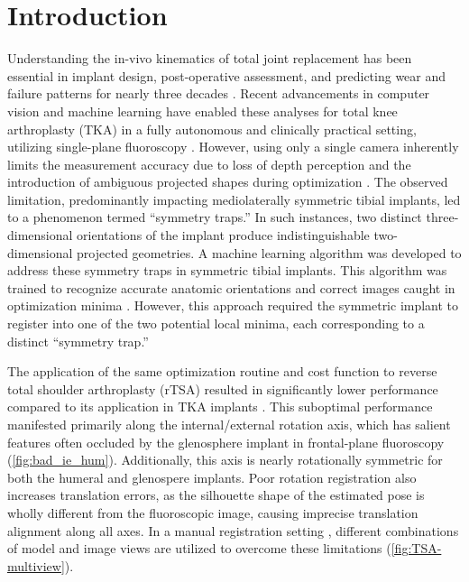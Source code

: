 \section{Introduction}
Understanding the in-vivo kinematics of total joint replacement has been essential in implant design, post-operative assessment, and predicting wear and failure patterns for nearly three decades \cite{freglyComputationalWearPrediction2005,banks2003HapPaul2004,banksRationaleResultsFixedBearing2019}.
Recent advancements in computer vision and machine learning have enabled these analyses for total knee arthroplasty (TKA) in a fully autonomous and clinically practical setting, utilizing single-plane fluoroscopy \cite{brobergValidationMachineLearning2023,jensenJointTrackMachine2023}.
However, using only a single camera inherently limits the measurement accuracy due to loss of depth perception and the introduction of ambiguous projected shapes during optimization \cite{floodAutomatedRegistration3D2018,mahfouzRobustMethodRegistration2003,zuffiModelbasedMethodReconstruction1999,banksAccurateMeasurementThreedimensional1996}.
The observed limitation, predominantly impacting mediolaterally symmetric tibial implants, led to a phenomenon termed “symmetry traps.”
In such instances, two distinct three-dimensional orientations of the implant produce indistinguishable two-dimensional projected geometries.
A machine learning algorithm was developed to address these symmetry traps in symmetric tibial implants.
This algorithm was trained to recognize accurate anatomic orientations and correct images caught in optimization minima \cite{jensenCorrectingSymmetricImplantInReview}.
However, this approach required the symmetric implant to register into one of the two potential local minima, each corresponding to a distinct “symmetry trap.”

The application of the same optimization routine and cost function \cite{floodAutomatedRegistration3D2018,jensenJointTrackMachine2023} to reverse total shoulder arthroplasty (rTSA) resulted in significantly lower performance compared to its application in TKA implants \cite{jensenJointTrackMachine2023}.
This suboptimal performance manifested primarily along the internal/external rotation axis, which has salient features often occluded by the glenosphere implant in frontal-plane fluoroscopy (\cref{fig:bad_ie_hum}).
Additionally, this axis is nearly rotationally symmetric for both the humeral and glenospere implants.
Poor rotation registration also increases translation errors, as the silhouette shape of the estimated pose is wholly different from the fluoroscopic image, causing imprecise translation alignment along all axes.
In a manual registration setting \cite{muJointTrackOpenSourceEasily2007}, different combinations of model and image views are utilized to overcome these limitations (\cref{fig:TSA-multiview}).

